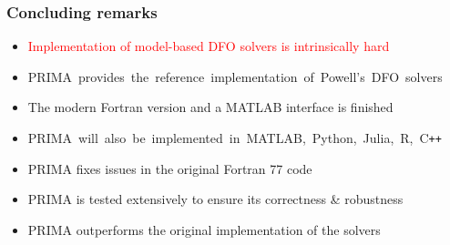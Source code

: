\documentclass[slidestop,mathserif,xcolor=dvipsnames]{beamer}
\newcommand{\red}[1]{\textcolor{red}{#1}}
\begin{document}
\begin{frame}
  \frametitle{Concluding remarks}
    \begin{itemize}
        \item \red{Implementation of model-based DFO solvers is intrinsically hard}
            \vspace{0.5ex}
        \item \mbox{PRIMA provides the reference implementation of Powell's DFO~\!solvers\!}%
            \vspace{0.5ex}
        \item The modern Fortran version and a MATLAB interface is finished
            \vspace{0.5ex}
        \item \mbox{PRIMA will also be implemented in MATLAB, Python, Julia, R, C\texttt{++}}
            \vspace{0.5ex}
        \item PRIMA fixes issues in the original Fortran 77 code
            \vspace{0.5ex}
        \item PRIMA is tested extensively to ensure its correctness \& robustness%
            \vspace{0.5ex}
        \item PRIMA outperforms the original implementation of the solvers
    \end{itemize}



\end{frame}
\end{document}
